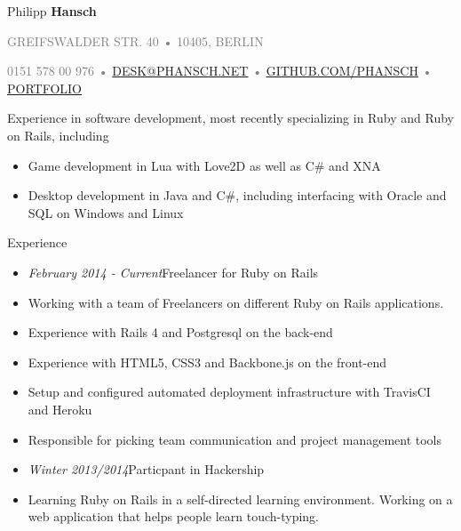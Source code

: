 \documentclass[12pt]{article}
\begin{document}
\thispagestyle{empty}



{\Huge Philipp \textbf{Hansch}}

{\footnotesize
  \textcolor{Gray}{
    \uppercase{Greifswalder Str. 40}
    •
    \uppercase{10405, Berlin}
  }

  \textcolor{Gray}{
    0151 578 00 976
    •
    \uppercase{\href{mailto:desk@phansch.net}{desk@phansch.net} }
    •
    \uppercase{\href{http://github.com/phansch}{github.com/phansch}}
    •
    \uppercase{\href{http://portfolio.phansch.net/\#folio-mid}{Portfolio}}
  }
}

\vspace{0.5cm}

Experience in software development, most recently specializing in Ruby and Ruby on Rails, including

\begin{itemize}
  \setlength{\itemsep}{0.1cm}
  \setlength{\parskip}{0.1cm}
  \item Game development in Lua with Love2D as well as C\# and XNA
  \item Desktop development in Java and C\#, including interfacing with Oracle and SQL on Windows and Linux
\end{itemize}
\vspace{0.5cm}

{\Large Experience}
\begin{itemize}
  \setlength{\itemsep}{0cm}
  \setlength{\parskip}{0cm}

  \item[] \emph{February 2014 - Current}\hfill Freelancer for Ruby on Rails
  \item[] Working with a team of Freelancers on different Ruby on Rails applications.
  \item[] Experience with Rails 4 and Postgresql on the back-end
  \item[] Experience with HTML5, CSS3 and Backbone.js on the front-end
  \item[] Setup and configured automated deployment infrastructure with TravisCI and Heroku
  \item[] Responsible for picking team communication and project management tools
\end{itemize}

\begin{itemize}
  \setlength{\itemsep}{0cm}
  \setlength{\parskip}{0cm}

  \item[] \emph{Winter 2013/2014}\hfill Particpant in Hackership
  \item[] Learning Ruby on Rails in a self-directed learning environment. Working on a web application that helps people learn touch-typing.
\end{itemize}
\end{document}

